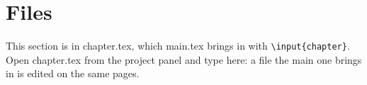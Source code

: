 \section{Files}

This section is in chapter.tex, which main.tex brings in with \texttt{\textbackslash input\{chapter\}}. Open chapter.tex from the project panel and type here: a file the main one brings in is edited on the same pages.
